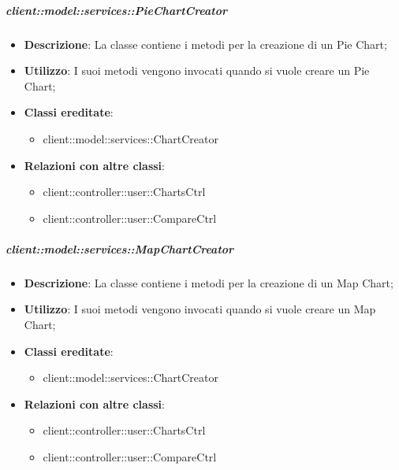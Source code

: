 		\subparagraph{client::model::services::PieChartCreator} %
		\label{subp:piechartcreator}
			\begin{itemize}
				\item \textbf{Descrizione}: La classe contiene i metodi per la creazione di un Pie Chart;
				\item \textbf{Utilizzo}: I suoi metodi vengono invocati quando si vuole creare un Pie Chart;
				\item \textbf{Classi ereditate}:
					\begin{itemize}
						\item client::model::services::ChartCreator
					\end{itemize}
				\item \textbf{Relazioni con altre classi}:
					\begin{itemize}
						\item client::controller::user::ChartsCtrl
						\item client::controller::user::CompareCtrl
					\end{itemize}
			\end{itemize}

		\subparagraph{client::model::services::MapChartCreator} %
		\label{subp:mapchartcreator}
			\begin{itemize}
				\item \textbf{Descrizione}: La classe contiene i metodi per la creazione di un Map Chart;
				\item \textbf{Utilizzo}: I suoi metodi vengono invocati quando si vuole creare un Map Chart;
				\item \textbf{Classi ereditate}:
					\begin{itemize}
						\item client::model::services::ChartCreator
					\end{itemize}
				\item \textbf{Relazioni con altre classi}:
					\begin{itemize}
						\item client::controller::user::ChartsCtrl
						\item client::controller::user::CompareCtrl
					\end{itemize}
			\end{itemize}

